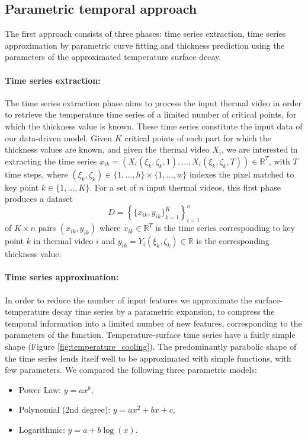 \subsection{Parametric temporal approach} \label{Parametric Temporal approach}

The first approach consists of three phases: time series extraction, time series approximation by parametric curve fitting and thickness prediction using the parameters of the approximated temperature surface decay.

\paragraph{Time series extraction:} 

The time series extraction phase aims to process the input thermal video in order to retrieve the temperature time series of a limited number of critical points, for which the thickness value is known. These time series constitute the input data of our data-driven model. Given $K$ critical points of each part for which the thickness values are known, and given the thermal video $X_{i}$, we are interested in extracting the time series ${x}_{ik} = \left (X_{i}(\xi_{k}, \zeta_{k},1),\ldots,X_{i}(\xi_{k}, \zeta_{k},T) \right) \in \mathds{R}^{T}$, with $T$ time steps, where $(\xi_{k}, \zeta_{k}) \in \{1,\ldots,h\}\times\{1,\ldots,w\}$ indexes the pixel matched to key point $k \in \{1,\ldots,K\}$. For a set of $n$ input thermal videos, this first phase produces a dataset
\begin{equation}
    D = \left\{\{x_{ik},y_{ik}\}_{k=1}^K\right\}_{i=1}^n
\end{equation}
of $K \times n$ pairs $(x_{ik},y_{ik})$ where $x_{ik} \in \mathds{R}^{T}$ is the time series corresponding to key point $k$ in thermal video $i$ and $y_{ik} = Y_{i}(\xi_{k}, \zeta_{k}) \in \mathds{R}$ is the corresponding thickness value.


\paragraph{Time series approximation:}

In order to reduce the number of input features we approximate the surface-temperature decay time series by a parametric expansion,  to compress the temporal information into a limited number of new features, corresponding to the parameters of the function. Temperature-surface time series have a fairly simple shape (Figure \ref{fig:temperature_cooling}). The predominantly parabolic shape of the time series lends itself well to be approximated with simple functions, with few parameters. We compared the following three parametric models:
\begin{itemize}
    \item Power Law: $y=ax^b$,
    \item Polynomial (2nd degree): $y=ax^2+bx+c$,
    \item Logarithmic: $y=a+b\log(x)$.
\end{itemize}

